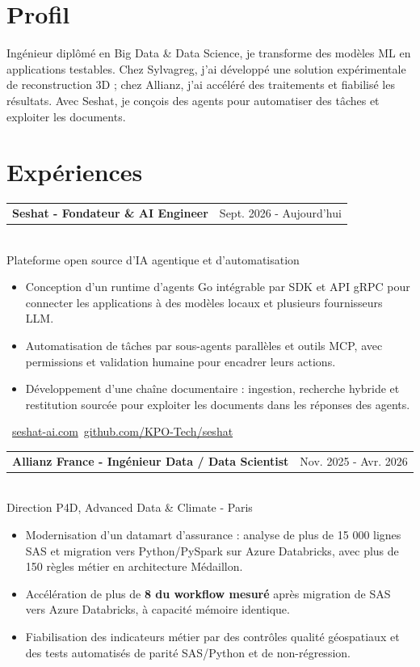 \documentclass[10pt,a4paper]{article}
\makeatletter
\newcommand{\role}[3]{%
  \vspace{3pt}
  \begin{tabularx}{\linewidth}{@{}Xr@{}}
  \textbf{#1} & {\color{muted}#2}
  \end{tabularx}\vspace{0.8pt}\\
  {\color{muted}#3}\par
  \vspace{3pt}
}
\makeatother
\begin{document}
\begin{lrbox}{\maincolumnbox}
\begin{minipage}[t]{0.695\textwidth}
\vspace{0pt}
\raggedright

\section{Profil}
Ingénieur diplômé en Big Data \& Data Science, je transforme des modèles ML en applications testables. Chez Sylvagreg, j'ai développé une solution expérimentale de reconstruction 3D ; chez Allianz, j'ai accéléré des traitements et fiabilisé les résultats. Avec Seshat, je conçois des agents pour automatiser des tâches et exploiter les documents.

\section{Expériences}
\role{Seshat - Fondateur \& AI Engineer}{Sept. 2026 - Aujourd'hui}{Plateforme open source d'IA agentique et d'automatisation}
\begin{itemize}
  \item Conception d'un runtime d'agents Go intégrable par SDK et API gRPC pour connecter les applications à des modèles locaux et plusieurs fournisseurs LLM.
  \item Automatisation de tâches par sous-agents parallèles et outils MCP, avec permissions et validation humaine pour encadrer leurs actions.
  \item Développement d'une chaîne documentaire : ingestion, recherche hybride et restitution sourcée pour exploiter les documents dans les réponses des agents.
\end{itemize}
{\footnotesize\color{accent}\ \href{https://seshat-ai.com}{seshat-ai.com}\enspace\textbullet\enspace{}\ \href{https://github.com/KPO-Tech/seshat}{github.com/KPO-Tech/seshat}}\par

\vspace{8pt}
\role{Allianz France - Ingénieur Data / Data Scientist}{Nov. 2025 - Avr. 2026}{Direction P4D, Advanced Data \& Climate - Paris}
\begin{itemize}
  \item Modernisation d'un datamart d'assurance : analyse de plus de 15 000 lignes SAS et migration vers Python/PySpark sur Azure Databricks, avec plus de 150 règles métier en architecture Médaillon.
  \item Accélération de plus de \textbf{8\texttimes{} du workflow mesuré} après migration de SAS vers Azure Databricks, à capacité mémoire identique.
  \item Fiabilisation des indicateurs métier par des contrôles qualité géospatiaux et des tests automatisés de parité SAS/Python et de non-régression.
\end{itemize}


\end{minipage}
\end{lrbox}
\end{document}
